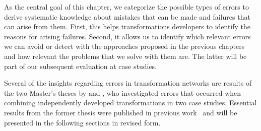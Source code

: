 
As the central goal of this chapter, we categorize the possible types of errors to derive systematic knowledge about mistakes that can be made and failures that can arise from them.
First, this helps transformations developers to identify the reasons for arising failures.
Second, it allows us to identify which relevant errors we can avoid or detect with the approaches proposed in the previous chapters and how relevant the problems that we solve with them are.
The latter will be part of our subsequent evaluation at case studies.

Several of the insights regarding errors in transformation networks are results of the two Master's theses by  and , who investigated errors that occurred when combining independently developed transformations in two case studies.
Essential results from the former thesis were published in previous work~ and will be presented in the following sections in revised form.






